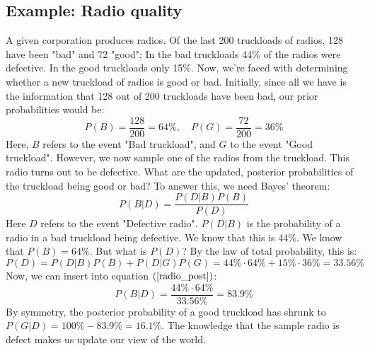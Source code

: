 \documentclass[12pt, a4paper]{article}
\begin{document}
\subsection{Example: Radio quality}
A given corporation produces radios. Of the last 200 truckloads of radios, 128 have been "bad" and 72 "good"; In the bad truckloads 44\% of the radios were defective. In the good truckloads only 15\%. Now, we're faced with determining whether a new truckload of radios is good or bad. Initially, since all we have is the information that 128 out of 200 truckloads have been bad, our prior probabilities would be:
\begin{equation}
P(B)=\frac{128}{200}=64\%,\quad P(G)=\frac{72}{200}=36\%
\end{equation}
Here, $B$ refers to the event "Bad truckload", and $G$ to the event "Good truckload". However, we now sample one of the radios from the truckload. This radio turns out to be defective. What are the updated, posterior probabilities of the truckload being good or bad? To answer this, we need Bayes' theorem:
\begin{equation}
\label{radio_post}
P(B|D)=\frac{P(D|B)P(B)}{P(D)}
\end{equation}
Here $D$ refers to the event "Defective radio". $P(D|B)$ is the probability of a radio in a bad truckload being defective. We know that this is 44\%. We know that $P(B)=64\%$. But what is $P(D)$? By the law of total probability, this is:
\begin{equation}
P(D)=P(D|B)P(B)+P(D|G)P(G)=44\%\cdot 64\% + 15\%\cdot 36\% = 33.56\%
\end{equation}
Now, we can insert into equation $(\ref{radio_post})$:
\begin{equation}
P(B|D)=\frac{44\%\cdot 64\%}{33.56\%}=83.9\%
\end{equation}
By symmetry, the posterior probability of a good truckload has shrunk to $P(G|D)=100\%-83.9\%=16.1\%$. The knowledge that the sample radio is defect makes us update our view of the world.
\end{document}
